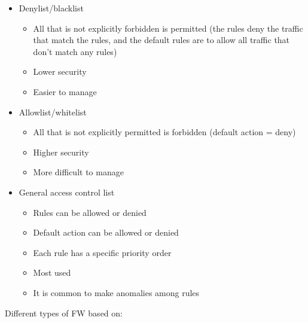 \documentclass{article}
\begin{document}
\begin{itemize}
\begin{itemize}
          \end{itemize}
        \item Denylist/blacklist
          \begin{itemize}
            \item All that is not explicitly forbidden is permitted (the rules deny the traffic that match the rules, and the default rules are to allow all traffic that don’t match any rules)
            \item Lower security 
            \item Easier to manage
          \end{itemize}
        \item Allowlist/whitelist
          \begin{itemize}
            \item All that is not explicitly permitted is forbidden (default action = deny)
            \item Higher security
            \item More difficult to manage
          \end{itemize}
        \item General access control list
          \begin{itemize}
            \item Rules can be allowed or denied
            \item Default action can be allowed or denied
            \item Each rule has a specific priority order
            \item Most used
            \item It is common to make anomalies among rules
          \end{itemize}
      \end{itemize}
    Different types of FW based on:
\end{document}
